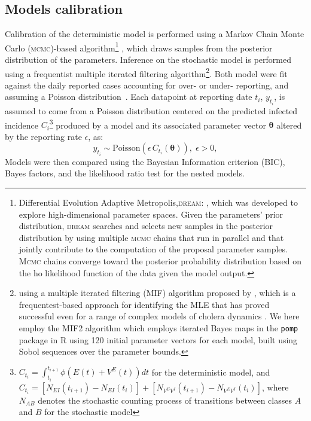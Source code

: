 \subsection{Models calibration}
Calibration of the deterministic model is performed using a Markov Chain Monte Carlo (\textsc{mcmc})-based algorithm\footnote[][-5\baselineskip]{Differential Evolution Adaptive Metropolis,\textsc{dream}: \parencite{Vrugt:MarkovChainMonte:2016}, which was developed to explore high-dimensional parameter spaces. Given the parameters' prior distribution, \textsc{dream} searches and selects new samples in the posterior distribution by using multiple \textsc{mcmc} chains that run in parallel and that jointly contribute to the computation of the proposal parameter samples. \textsc{Mcmc} chains  converge toward the posterior probability distribution based on the ho likelihood function of the data given the model output.} , which draws samples from the posterior distribution of the parameters.
Inference on the stochastic model is performed using a frequentist multiple iterated filtering algorithm\footnote{using a multiple iterated filtering (MIF) algorithm proposed by \parencite{Ionides:InferenceDynamicLatent:2015}, which is a frequentest-based approach for identifying the MLE that has proved successful even for a range of complex models of cholera dynamics \parencite{King:InapparentInfectionsCholera:2008,Baracchini:SeasonalityCholeraDynamics:2017}. We here employ the MIF2 algorithm which employs iterated Bayes maps in the \texttt{pomp} package in R \parencite{King:StatisticalInferencePartially:2015} using 120 initial parameter vectors for each model, built using Sobol sequences over the parameter bounds.}. Both model were fit against the daily reported cases accounting for over- or under- reporting, and assuming a Poisson distribution~\cite{Camacho:CholeraEpidemicYemen:2018}. Each datapoint at reporting date $t_i$,  $y_{t_i}$, is assumed to come from a Poisson distribution centered on the predicted infected incidence $C_i$\footnote{$ C_{t_i} = \int_{t_i}^{t_{i+1}} \phi \left(E(t) + V^E(t)\right) dt  $ for the deterministic model, and $ C_{t_i} = [N_{EI}(t_{i+1}) - N_{EI}(t_i)] + [N_{V^EV^I}(t_{i+1}) - N_{V^EV^I}(t_i)] $, where $N_{AB}$ denotes the stochastic counting process of transitions between classes $A$ and $B$ for the stochastic model} produced by a model and its associated parameter vector $\boldsymbol{\theta}$ altered by the reporting rate $\epsilon$, as:
\begin{equation}
 y_{t_i}  \sim \text{Poisson}\left(\epsilon \,C_{t_i}(\boldsymbol{\theta})\right), \; \epsilon > 0,
 \label{eq:obs}
\end{equation}
 Models were then compared using the Bayesian Information criterion (BIC), Bayes factors, and the likelihood ratio test for the nested models.
 

